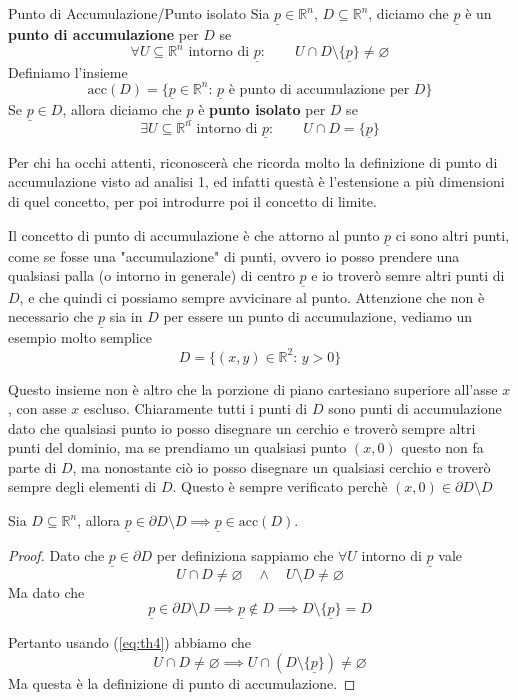 \documentclass{rapport}
\begin{document}
\begin{definizione}{Punto di Accumulazione/Punto isolato}{}
  Sia $\underline{p} \in\mathbb{R}^n$, $D\subseteq \mathbb{R}^n$, diciamo che $\underline{p}$ è un \textbf{punto di accumulazione} per $D$ se 
  \[
  \forall U\subseteq \mathbb{R}^n \text{ intorno di } \underline{p} : \qquad U \cap D \setminus \{\underline{p}\} \ne \varnothing
  \]
  Definiamo l'insieme 
  \[
  \text{acc}(D) = \{\underline{p} \in\mathbb{R}^n: \, \underline{p} \text{ è punto di accumulazione per } D\}
  \]
  Se $\underline{p} \in D$, allora diciamo che $\underline{p}$ è \textbf{punto isolato} per $D$ se 
  \[
  \exists U\subseteq \mathbb{R}^n \text{ intorno di } \underline{p} : \qquad U \cap D = \{\underline{p}\}
  \]

\end{definizione}

Per chi ha occhi attenti, riconoscerà che ricorda molto la definizione di punto di accumulazione visto ad analisi 1, ed infatti questà è l'estensione a più dimensioni di quel concetto, per poi introdurre poi il concetto di limite.

Il concetto di punto di accumulazione è che attorno al punto $\underline{p}$ ci sono altri punti, come se fosse una "accumulazione" di punti, ovvero io posso prendere una qualsiasi palla (o intorno in generale) di centro $\underline{p}$ e io troverò semre altri punti di $D$, e che quindi ci possiamo sempre avvicinare al punto. Attenzione che non è necessario che $\underline{p}$ sia in $D$ per essere un punto di accumulazione, vediamo un esempio molto semplice 
\[
 D = \{(x,y) \in \mathbb{R}^2: \, y>0\}
\]

Questo insieme non è altro che la porzione di piano cartesiano superiore all'asse $x$, con asse $x$ escluso. Chiaramente tutti i punti di $D$ sono punti di accumulazione dato che qualsiasi punto io posso disegnare un cerchio e troverò sempre altri punti del dominio, ma se prendiamo un qualsiasi punto $(x, 0)$ questo non fa parte di $D$, ma nonostante ciò io posso disegnare un qualsiasi cerchio e troverò sempre degli elementi  di $D$. Questo è sempre verificato perchè $(x,0) \in \partial D\setminus D$

\begin{teorema}{}{}
  Sia $D\subseteq \mathbb{R}^n$, allora $\underline{p} \in \partial D \setminus D \implies \underline{p} \in \text{acc}(D)$.
\end{teorema}

\begin{proof}
  Dato che $\underline{p} \in \partial D$ per definiziona sappiamo che $\forall U$ intorno di $\underline{p}$ vale 
  \begin{equation}
    \label{eq:th4}  
  U \cap D \ne \varnothing \quad \land \quad U \setminus D \ne \varnothing
  \end{equation}
   Ma dato che \[
  \underline{p} \in \partial D \setminus D \implies \underline{p} \notin D \implies D \setminus \{\underline{p}\} = D
  \]
  
  Pertanto usando (\ref{eq:th4}) abbiamo che 
  \[
  U \cap D \ne \varnothing \implies U \cap (D\setminus \{\underline{p}\})\ne \varnothing
  \]
  Ma questa è la definizione di punto di accumulazione.
\end{proof}
\end{document}
